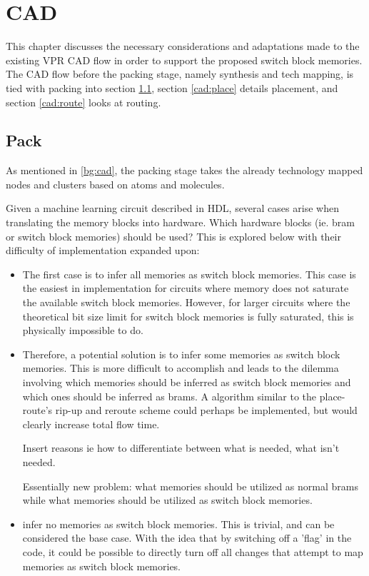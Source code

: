 
\chapter{CAD}
\label{ch:CAD}

This chapter discusses the necessary considerations and adaptations made to the existing VPR CAD flow in order to support the proposed switch block memories. The CAD flow before the packing stage, namely synthesis and tech mapping, is tied with packing into section \ref{cad:pack}, section \ref{cad:place} details placement, and section \ref{cad:route} looks at routing.

\section{Pack}
\label{cad:pack}

As mentioned in \ref{bg:cad}, the packing stage takes the already technology mapped nodes and clusters based on atoms and molecules.

Given a machine learning circuit described in HDL, several cases arise when translating the memory blocks into hardware. Which hardware blocks (ie. bram or switch block memories) should be used? This is explored below with their difficulty of implementation expanded upon:
\begin{itemize}
    \item The first case is to infer all memories as switch block memories. This case is the easiest in implementation for circuits where memory does not saturate the available switch block memories. However, for larger circuits where the theoretical bit size limit for switch block memories is fully saturated, this is physically impossible to do.
    \item Therefore, a potential solution is to infer some memories as switch block memories. This is more difficult to accomplish and leads to the dilemma involving which memories should be inferred as switch block memories and which ones should be inferred as brams. A algorithm similar to the place-route's rip-up and reroute scheme could perhaps be implemented, but would clearly increase total flow time. 
   
        Insert reasons ie how to differentiate between what is needed, what isn't needed. 
    
    Essentially new problem: what memories should be utilized as normal brams while what memories should be utilized as switch block memories.
    \item infer no memories as switch block memories. This is trivial, and can be considered the base case. With the idea that by switching off a 'flag' in the code, it could be possible to directly turn off all changes that attempt to map memories as switch block memories.
\end{itemize}

